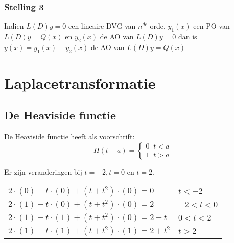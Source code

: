 \subsection{Stelling 3}
Indien $L(D)y = 0$ een lineaire DVG van $n^{de}$ orde, $y_1(x)$ een PO van $L(D)y = Q(x)$ en $y_2(x)$ de AO van $L(D)y = 0$ dan is $y(x) = y_1(x) + y_2(x)$ de AO van $L(D)y = Q(x)$


\chapter{Laplacetransformatie}
\section{De Heaviside functie}
De Heaviside functie heeft als voorschrift:
$$H(t - a) = 
\begin{cases}
0 \;\; t < a \\
1 \;\; t > a
\end{cases}$$

{
Er zijn veranderingen bij $t = -2, t = 0$ en $t = 2$.

    \begin{tabular}{l | l}
    $2\cdot(0) - t\cdot(0) + (t+t^2)\cdot(0) = 0$ & $t < -2$\\
    $2\cdot(1) - t\cdot(0) + (t+t^2)\cdot(0) = 2$ & $-2 < t < 0$  \\
    $2\cdot(1) - t\cdot(1) + (t+t^2)\cdot(0) = 2 - t$ & $0 < t < 2$\\
    $2\cdot(1) - t\cdot(1) + (t+t^2)\cdot(1) = 2 + t^2$ & $t > 2$\\
    \end{tabular}
}

